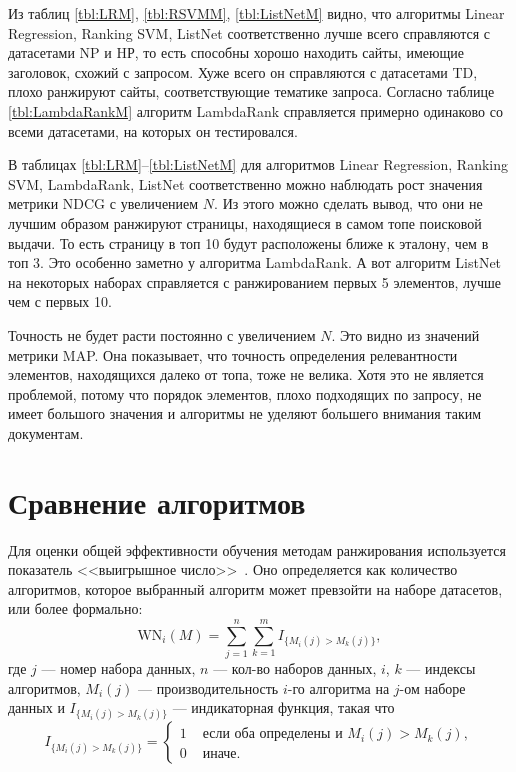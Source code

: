Из таблиц \ref{tbl:LRM}, \ref{tbl:RSVMM}, \ref{tbl:ListNetM} видно, что алгоритмы Linear Regression, Ranking SVM, ListNet соответственно лучше всего справляются с датасетами NP и HР, то есть способны хорошо находить сайты, имеющие заголовок, схожий с запросом. Хуже всего он справляются с датасетами TD, плохо ранжируют сайты, соответствующие тематике запроса. Согласно таблице \ref{tbl:LambdaRankM} алгоритм LambdaRank справляется примерно одинаково со всеми датасетами, на которых он тестировался.

В таблицах \ref{tbl:LRM}--\ref{tbl:ListNetM} для алгоритмов Linear Regression, Ranking SVM, LambdaRank, ListNet соответственно можно наблюдать рост значения метрики NDCG с увеличением $N$. Из этого можно сделать вывод, что они не лучшим образом ранжируют страницы, находящиеся в самом топе поисковой выдачи. То есть страницу в топ 10 будут расположены ближе к эталону, чем в топ 3. Это особенно заметно у алгоритма LambdaRank. А вот алгоритм ListNet на некоторых наборах справляется с ранжированием первых 5 элементов, лучше чем с первых 10.

Точность не будет расти постоянно с увеличением $N$. Это видно из значений метрики MAP. Она показывает, что точность определения релевантности элементов, находящихся далеко от топа, тоже не велика. Хотя это не является проблемой, потому что порядок элементов, плохо подходящих по запросу, не имеет большого значения и алгоритмы не уделяют большего внимания таким документам.

\section{Сравнение алгоритмов}
Для оценки общей эффективности обучения методам ранжирования используется показатель <<выигрышное число>>~\cite{cmp}. Оно определяется как количество алгоритмов, которое выбранный алгоритм может превзойти на наборе датасетов, или более формально:
\begin{equation}
	\label{eq:wn1}
	\mathrm{WN}_i(M)=\sum_{j=1}^n \sum_{k=1}^m I_{\{M_i(j)>M_k(j)\}},
\end{equation}
где $j$ --- номер набора данных, $n$ --- кол-во наборов данных, $i$, $k$ --- индексы алгоритмов, $M_i(j)$ --- производительность $i$-го алгоритма на $j$-ом наборе данных и $I_{\{M_i(j)>M_k(j)\}}$ --- индикаторная функция, такая что
\[
I_{\{M_i(j)>M_k(j)\}}= \begin{cases}1 & \text { если оба определены и } M_i(j)>M_k(j), \\ 0 & \text { иначе. }\end{cases}
\]

